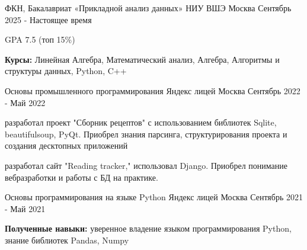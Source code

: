 

\begin{cventries}

  \cventry
    {ФКН, Бакалавриат «Прикладной анализ данных»} %
    {НИУ ВШЭ} %
    {Москва} %
    {Сентябрь 2025 - Настоящее время} %
    {
      \begin{cvitems} %
        \item {GPA 7.5 (топ 15\%)}
        \item {\textbf{Курсы:} Линейная Алгебра, Математический анализ, Алгебра, Алгоритмы и структуры данных,  Python, C++}
      \end{cvitems}
    }

          \cventry
    {Основы промышленного программирования} %
    {Яндекс лицей} %
    {Москва} %
    {Сентябрь 2022 - Май 2022} %
    {
      \begin{cvitems} %
        \item {разработал проект "Сборник рецептов" с использованием библиотек Sqlite, beautifulsoup, PyQt.  Приобрел знания парсинга, структурирования проекта и создания десктопных приложений}
         \item {разработал сайт "Reading tracker," использовал Django.  Приобрел понимание вебразработки и работы с БД на практике.}
      \end{cvitems}
    }
          \cventry
    {Основы программирования на языке Python} %
    {Яндекс лицей} %
    {Москва} %
    {Сентябрь 2021 - Май 2021} %
    {
      \begin{cvitems} %
        \item {\textbf{Полученные навыки:} уверенное владение языком программирования Python, знание библиотек Pandas, Numpy}
      \end{cvitems}
    }

    

\end{cventries}

